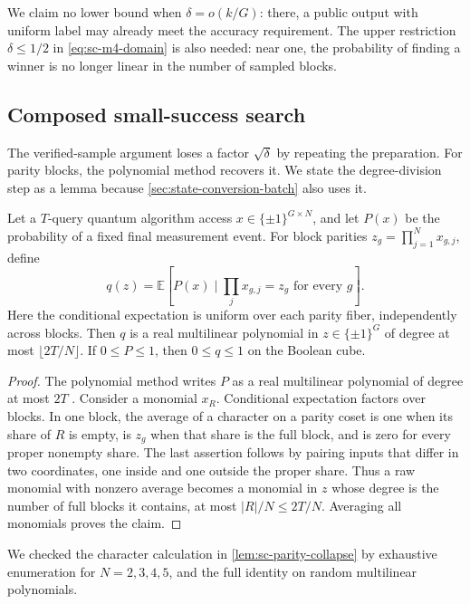 We claim no lower bound when $\delta=o(k/G)$: there, a public output with
uniform label may already meet the accuracy requirement.  The upper
restriction $\delta\le1/2$ in \eqref{eq:sc-m4-domain} is also needed:
near one, the probability of finding a winner is no longer linear in the
number of sampled blocks.

\subsection{Composed small-success search}
\label{sec:state-conversion-small-success}

The verified-sample argument loses a factor $\sqrt\delta$ by repeating the
preparation.  For parity blocks, the polynomial method recovers it.  We
state the degree-division step as a lemma because
\cref{sec:state-conversion-batch} also uses it.

\begin{lemma}
\label{lem:sc-parity-collapse}
Let a $T$-query quantum algorithm access
$x\in\{\pm1\}^{G\times N}$, and let $P(x)$ be the probability of a fixed
final measurement event.  For block parities
$z_g=\prod_{j=1}^N x_{g,j}$, define
\[
 q(z)=\mathbb E[P(x)\mid \textstyle\prod_jx_{g,j}=z_g
                  \text{ for every }g].
\]
Here the conditional expectation is uniform over each parity fiber,
independently across blocks.
Then $q$ is a real multilinear polynomial in $z\in\{\pm1\}^G$ of degree
at most $\lfloor2T/N\rfloor$.  If $0\le P\le1$, then $0\le q\le1$ on
the Boolean cube.
\end{lemma}

\begin{proof}
The polynomial method writes $P$ as a real multilinear polynomial of degree
at most $2T$ \cite{beals2001-quantum-lower-bounds-by-polynomials}.  Consider
a monomial $x_R$.  Conditional expectation factors over blocks.  In one
block, the average of a character on a parity coset is one when its share of
$R$ is empty, is $z_g$ when that share is the full block, and is zero for
every proper nonempty share.  The last assertion follows by pairing inputs
that differ in two coordinates, one inside and one outside the proper
share.  Thus a raw monomial with nonzero average becomes a monomial in $z$ whose
degree is the number of full blocks it contains, at most
$|R|/N\le2T/N$.  Averaging all monomials proves the claim.
\end{proof}

\begin{remark}
We checked the character calculation in \cref{lem:sc-parity-collapse} by
exhaustive enumeration for $N=2,3,4,5$, and the full identity on random
multilinear polynomials.
\end{remark}


